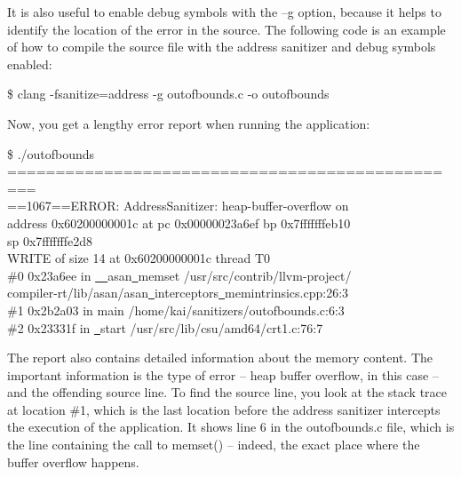 It is also useful to enable debug symbols with the –g option, because it helps to identify the location of the error in the source. The following code is an example of how to compile the source file with the address sanitizer and debug symbols enabled:\par

\begin{tcolorbox}[colback=white,colframe=black]
\$ clang -fsanitize=address -g outofbounds.c -o outofbounds
\end{tcolorbox}

Now, you get a lengthy error report when running the application:\par

\begin{tcolorbox}[colback=white,colframe=black]
\$ ./outofbounds \\
============================================= \\
=== \\
==1067==ERROR: AddressSanitizer: heap-buffer-overflow on \\
address 0x60200000001c at pc 0x00000023a6ef bp 0x7fffffffeb10 \\
sp 0x7fffffffe2d8 \\
WRITE of size 14 at 0x60200000001c thread T0 \\
\hspace*{1cm}\#0 0x23a6ee in \underline{~~}asan\underline{~}memset /usr/src/contrib/llvm-project/ \\
compiler-rt/lib/asan/asan\underline{~}interceptors\underline{~}memintrinsics.cpp:26:3 \\
\hspace*{1cm}\#1 0x2b2a03 in main /home/kai/sanitizers/outofbounds.c:6:3 \\
\hspace*{1cm}\#2 0x23331f in \underline{~}start /usr/src/lib/csu/amd64/crt1.c:76:7
\end{tcolorbox}

The report also contains detailed information about the memory content. The important information is the type of error – heap buffer overflow, in this case – and the offending source line. To find the source line, you look at the stack trace at location \#1, which is the last location before the address sanitizer intercepts the execution of the application. It shows line 6 in the outofbounds.c file, which is the line containing the call to memset() – indeed, the exact place where the buffer overflow happens.\par

